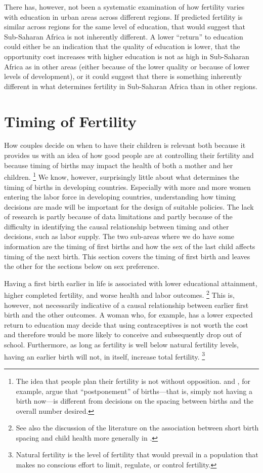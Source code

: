 \documentclass[letterpaper,12pt]{article}
\begin{document}
There has, however, not been a systematic examination of how fertility
varies with education in urban areas across different regions.
If predicted fertility is similar across regions for the same level of
education, that would suggest that Sub-Saharan Africa is not inherently
different.
A lower ``return'' to education could either be an indication that the
quality of education is lower, that the opportunity cost increases with
higher education is not as high in Sub-Saharan Africa as in other areas
(either because of the lower quality or because of lower levels of
development), or it could suggest that there is something inherently
different in what determines fertility in Sub-Saharan Africa than in
other regions.

\section{Timing of Fertility}

How couples decide on when to have their children is relevant both 
because it provides us with an idea of how good people are at controlling 
their fertility and because timing of births may impact the health of both 
a mother and her children.%
\footnote{
The idea that people plan their fertility is not without opposition.
\citet{Timaeus2008} and \citet{Moultrie2012}, for example, argue that
``postponement'' of births---that is, simply not having a birth now---is 
different from decisions on the spacing between births and the overall
number desired.
}
We know, however, surprisingly little about what determines the timing
of births in developing countries.
Especially with more and more women entering the labor force in
developing countries, understanding how timing decisions are made will
be important for the design of suitable policies.
The lack of research is partly because of data limitations and partly
because of the difficulty in identifying the causal relationship between
timing and other decisions, such as labor supply.
The two sub-areas where we do have some information are the timing of
first births and how the sex of the last child affects timing of the next birth.
This section covers the timing of first birth and leaves the other
for the sections below on sex preference.

Having a first birth earlier in life is associated with lower educational 
attainment, higher completed fertility, and worse health and labor outcomes.%
\footnote{
See also the discussion of the literature on the association between short 
birth spacing and child health more generally in \citet{Casterline2016}.
}
This is, however, not necessarily indicative of a causal relationship
between earlier first birth and the other outcomes.
A woman who, for example, has a lower expected return to education may
decide that using contraceptives is not worth the cost and therefore
would be more likely to conceive and subsequently drop out of school.
Furthermore, as long as fertility is well below natural fertility
levels, having an earlier birth will not, in itself, increase total
fertility.%
\footnote{
Natural fertility is the level of fertility that would prevail in a
population that makes no conscious effort to limit, regulate, or control
fertility.}
\end{document}
